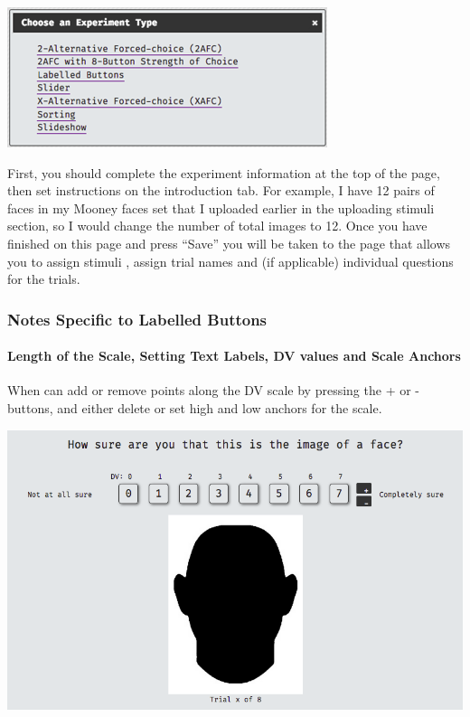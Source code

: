 \documentclass[]{book}
\let\oldparagraph\paragraph
\renewcommand{\paragraph}[1]{\oldparagraph{#1}\mbox{}}
\begin{document}
\includegraphics{images/screenshots/exp_2.png}

First, you should complete the experiment information at the top of the
page, then set instructions on the introduction tab. For example, I have
12 pairs of faces in my Mooney faces set that I uploaded earlier in the
uploading stimuli section, so I would change the number of total images
to 12. Once you have finished on this page and press ``Save'' you will
be taken to the page that allows you to assign stimuli , assign trial
names and (if applicable) individual questions for the trials.

\subsubsection*{Notes Specific to Labelled
Buttons}\label{notes-specific-to-labelled-buttons}

\paragraph{Length of the Scale, Setting Text Labels, DV values and Scale
Anchors}\label{length-of-the-scale-setting-text-labels-dv-values-and-scale-anchors}

When can add or remove points along the DV scale by pressing the + or -
buttons, and either delete or set high and low anchors for the scale.

\includegraphics{images/screenshots/lb.png}
\end{document}
